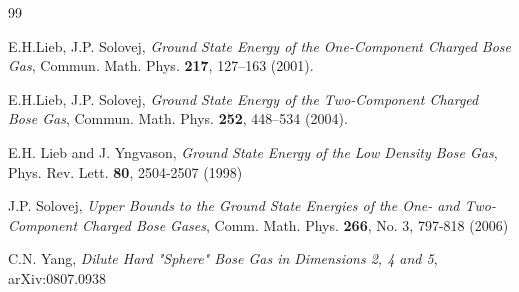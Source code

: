 \documentclass[11pt]{article}
\numberwithin{equation}{section}
\theoremstyle{definition}
\begin{document}
\begin{thebibliography}{99}

E.H.Lieb, J.P. Solovej, {\it Ground State Energy of the One-Component Charged Bose Gas}, Commun. Math. Phys. {\bf 217}, 127--163 (2001).

E.H.Lieb, J.P. Solovej, {\it Ground State Energy of the Two-Component Charged Bose Gas}, Commun. Math. Phys. {\bf 252}, 448--534 (2004).


  E.H. Lieb and J. Yngvason, {\it Ground State Energy of the Low Density Bose Gas}, Phys. Rev. Lett. {\bf 80}, 2504-2507 (1998)




 J.P. Solovej, {\it Upper Bounds to the Ground State Energies of the One- and Two-Component Charged Bose Gases}, Comm. Math. Phys. {\bf 266}, No. 3, 797-818 (2006)


 C.N. Yang, {\it Dilute Hard "Sphere" Bose Gas in Dimensions 2, 4 and 5}, arXiv:0807.0938
\end{thebibliography}
\end{document}
